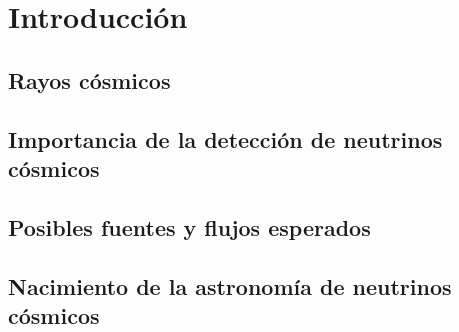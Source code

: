 \chapter{Introducci\'on}
\section{Rayos c\'osmicos}

\section{Importancia de la detecci\'on de neutrinos c\'osmicos}

\section{Posibles fuentes y flujos esperados}

\section{Nacimiento de la astronom\'ia de neutrinos c\'osmicos}